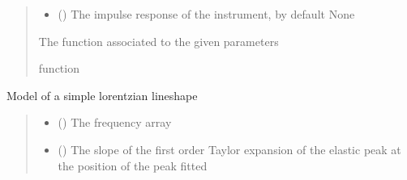 \documentclass[letterpaper,10pt,english]{sphinxmanual}
\begin{document}
\begin{fulllineitems}
\begin{fulllineitems}
\begin{quote}
\begin{description}
\begin{itemize}
\item {} 
\sphinxAtStartPar
{} (\sphinxstyleliteralemphasis{\sphinxupquote{, }}) \textendash{} The impulse response of the instrument, by default None

\end{itemize}

\sphinxAtStartPar
The function associated to the given parameters

\sphinxAtStartPar
function

\end{description}\end{quote}

\end{fulllineitems}


\begin{fulllineitems}
\label{\detokenize{source/_autosummary/HDF5_BLS_treat.Models:HDF5_BLS_treat.Models.lorentzian_elastic}}
\pysigstartsignatures
\pysiglinewithargsret
{}
{\sphinxparamcomma {}\sphinxparamcomma {}\sphinxparamcomma {}\sphinxparamcomma {}\sphinxparamcomma {}\sphinxparamcomma {}}
{}
\pysigstopsignatures
\sphinxAtStartPar
Model of a simple lorentzian lineshape
\begin{quote}\begin{description}
\begin{itemize}
\item {} 
\sphinxAtStartPar
{} () \textendash{} The frequency array

\item {} 
\sphinxAtStartPar
{} () \textendash{} The slope of the first order Taylor expansion of the elastic peak at the position of the peak fitted


\end{itemize}
\end{description}
\end{quote}
\end{fulllineitems}
\end{fulllineitems}
\end{document}
